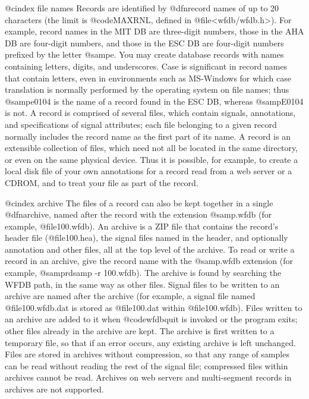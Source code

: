@cindex file names
Records are identified by @dfn{record names} of up to 20 characters
(the limit is @code{MAXRNL}, defined in @file{<wfdb/wfdb.h>}).  For
example, record names in the MIT DB are three-digit numbers, those in
the AHA DB are four-digit numbers, and those in the ESC DB are
four-digit numbers prefixed by the letter @samp{e}.  You may create
database records with names containing letters, digits, and
underscores.  Case is significant in record names that contain
letters, even in environments such as MS-Windows for which case
translation is normally performed by the operating system on file
names; thus @samp{e0104} is the name of a record found in the ESC DB,
whereas @samp{E0104} is not.  A record is comprised of several files,
which contain signals, annotations, and specifications of signal
attributes; each file belonging to a given record normally includes
the record name as the first part of its name.  A record is an
extensible collection of files, which need not all be located in the
same directory, or even on the same physical device.  Thus it is
possible, for example, to create a local disk file of your own
annotations for a record read from a web server or a CDROM, and to
treat your file as part of the record.

@cindex archive
The files of a record can also be kept together in a single
@dfn{archive}, named after the record with the extension @samp{.wfdb}
(for example, @file{100.wfdb}).  An archive is a ZIP file that contains
the record's header file (@file{100.hea}), the signal files named in the
header, and optionally annotation and other files, all at the top level
of the archive.  To read or write a record in an archive, give the
record name with the @samp{.wfdb} extension (for example,
@samp{rdsamp -r 100.wfdb}).  The archive is found by searching the WFDB
path, in the same way as other files.  Signal files to be written to an
archive are named after the archive (for example, a signal file named
@file{100.wfdb.dat} is stored as @file{100.dat} within @file{100.wfdb}).
Files written to an archive are added to it when @code{wfdbquit} is
invoked or the program exits;  other files already in the archive are
kept.  The archive is first written to a temporary file, so that if an
error occurs, any existing archive is left unchanged.  Files are stored
in archives without compression, so that any range of samples can be
read without reading the rest of the signal file;  compressed files
within archives cannot be read.  Archives on web servers and
multi-segment records in archives are not supported.

